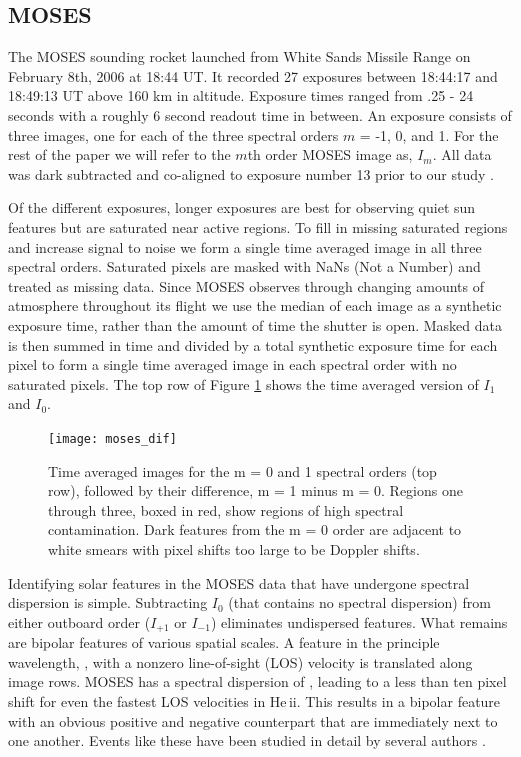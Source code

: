 	\subsection{MOSES}\label{sec:MOSES_data}
	
		The MOSES sounding rocket launched from White Sands Missile Range on February 8th, 2006 at 18:44 UT. 
		It recorded 27 exposures between 18:44:17 and 18:49:13 UT above 160 km in altitude.  
		Exposure times ranged from .25 - 24 seconds with a roughly 6 second readout time in between.  
		An exposure consists of three images, one for each of the three spectral orders $m$ = -1, 0, and 1.
		For the rest of the paper we will refer to the $m$th order MOSES image as, $I_m$.  
		All data was dark subtracted and co-aligned to exposure number 13 prior to our study \citep{Fox2011}. 
		
		Of the different exposures, longer exposures are best for observing quiet sun features but are saturated near active regions.  
		To fill in missing saturated regions and increase signal to noise we form a single time averaged image in all three spectral orders. 
		Saturated pixels are masked with NaNs (Not a Number) and treated as missing data. 
		Since MOSES observes through changing amounts of atmosphere throughout its flight we use the median of each image as a synthetic exposure time, rather than the amount of time the shutter is open.
		Masked data is then summed in time and divided by a total synthetic exposure time for each pixel to form a single time averaged image in each spectral order with no saturated pixels.  
		The top row of Figure \ref{fig:moses_super} shows the time averaged version of $I_1$ and $I_0$. 
		
		\begin{figure}
			\centering
			\texttt{[image: moses\_dif]}
			\caption{Time averaged images for the m = 0 and 1 spectral orders (top row), followed by their difference, m = 1 minus m = 0.  Regions one through three, boxed in red, show regions of high spectral contamination. Dark features from the m = 0 order are adjacent to white smears with pixel shifts too large to be Doppler shifts.}
			\label{fig:moses_super}
		\end{figure}
	
		
		Identifying solar features in the MOSES data that have undergone spectral dispersion is simple. 
		Subtracting $I_0$ (that contains no spectral dispersion) from either outboard order ($I_{+1}$ or $I_{-1}$) eliminates undispersed features. 
		What remains are bipolar features of various spatial scales.  
		A feature in the principle wavelength, \heii, with a nonzero line-of-sight (LOS) velocity is translated along image rows.    
		MOSES has a spectral dispersion of \spectdispersvel, leading to a less than ten pixel shift for even the fastest LOS velocities in He\,{\sc ii}. 
		This results in a bipolar feature with an obvious positive and negative counterpart that are immediately next to one another. Events like these have been studied in detail by several authors \citep{Fox2011,Courrier2018,Rust2019}.
		
